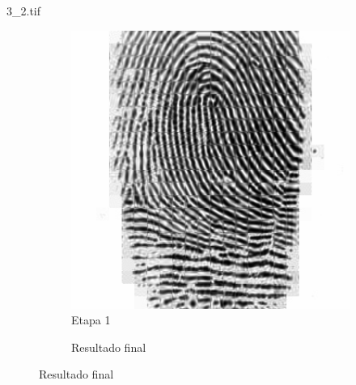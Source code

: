 \documentclass{beamer}
\begin{document}
\begin{frame}{3\_2.tif}
\begin{figure}
\begin{subfigure}[!ht]{0.32\textwidth}
                \includegraphics[width=\columnwidth]{Fingerprints/3_2_intermediate.jpg}
                \caption{Etapa 1}
            \end{subfigure}
            \begin{subfigure}[!ht]{0.32\textwidth}
                \caption{Resultado final}
            \end{subfigure}
        \end{figure}
    \end{frame}
\end{document}
